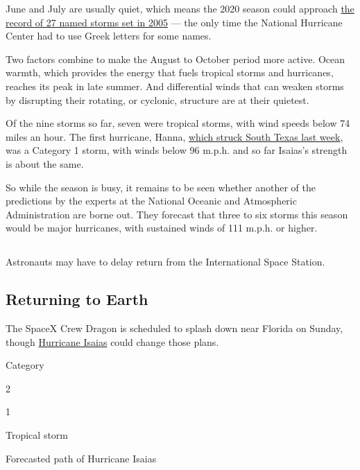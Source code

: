 June and July are usually quiet, which means the 2020 season could
approach
\href{https://slack-redir.net/link?url=https\%3A\%2F\%2Fwww.nhc.noaa.gov\%2Fdata\%2Ftcr\%2Findex.php\%3Fseason\%3D2005\%26basin\%3Datl}{the
record of 27 named storms set in 2005} --- the only time the National
Hurricane Center had to use Greek letters for some names.

Two factors combine to make the August to October period more active.
Ocean warmth, which provides the energy that fuels tropical storms and
hurricanes, reaches its peak in late summer. And differential winds that
can weaken storms by disrupting their rotating, or cyclonic, structure
are at their quietest.

Of the nine storms so far, seven were tropical storms, with wind speeds
below 74 miles an hour. The first hurricane, Hanna,
\href{https://www.nytimes3xbfgragh.onion/2020/07/26/us/virus-texas-storm.html}{which
struck South Texas last week}, was a Category 1 storm, with winds below
96 m.p.h. and so far Isaias's strength is about the same.

So while the season is busy, it remains to be seen whether another of
the predictions by the experts at the National Oceanic and Atmospheric
Administration are borne out. They forecast that three to six storms
this season would be major hurricanes, with sustained winds of 111
m.p.h. or higher.

\hypertarget{-5}{%
\subsection{}\label{-5}}

Astronauts may have to delay return from the International Space
Station.

\hypertarget{returning-to-earth}{%
\subsection{Returning to Earth}\label{returning-to-earth}}

The SpaceX Crew Dragon is scheduled to splash down near Florida on
Sunday, though
\href{https://www.nytimes3xbfgragh.onion/interactive/2020/07/31/us/hurricane-isaias-tracker-map.html}{Hurricane
Isaias} could change those plans.

Category

2

1

Tropical storm

Forecasted path of Hurricane Isaias

